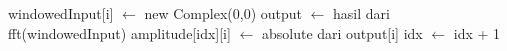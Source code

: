 \begin{itemize}
\begin{algorithm}[H]
\begin{algorithmic}
						\State windowedInput[i] $\leftarrow$ new Complex(0,0)
					\EndIf
				\EndFor
				\State output $\leftarrow$ hasil dari fft(windowedInput)
					\State amplitude[idx][i] $\leftarrow$ absolute dari output[i]				
				\EndFor
				\State idx $\leftarrow$ idx + 1
			\EndWhile
		\EndFunction
	\end{algorithmic}
	\end{algorithm}
\end{itemize}

